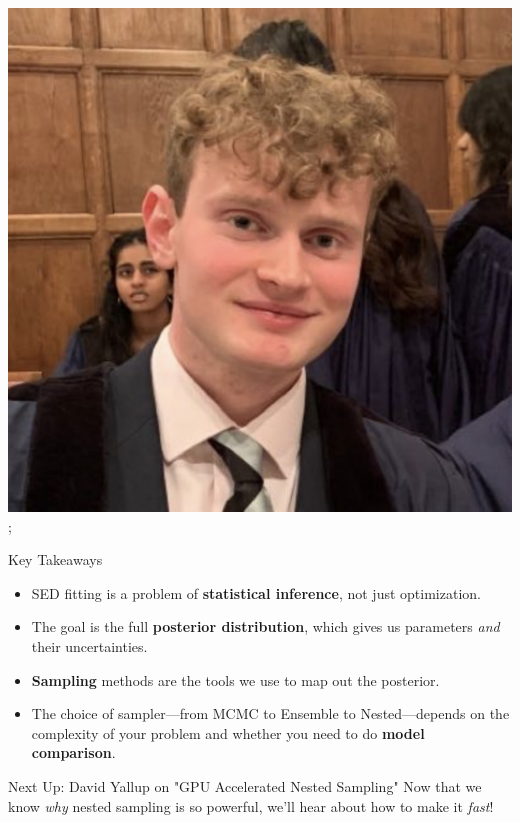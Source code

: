\documentclass[aspectratio=169]{beamer}
\newcommand{\keyterm}[1]{\textbf{\textcolor{C0}{#1}}}
\begin{document}
\begin{frame}
{        \includegraphics[width=0.06\textheight]{people/will_templeton.jpg}%
    };
    
    \begin{block}{Key Takeaways}
        \begin{itemize}
            \item SED fitting is a problem of \keyterm{statistical inference}, not just optimization.
            \item The goal is the full \keyterm{posterior distribution}, which gives us parameters \textit{and} their uncertainties.
            \item \keyterm{Sampling} methods are the tools we use to map out the posterior.
            \item The choice of sampler—from MCMC to Ensemble to Nested—depends on the complexity of your problem and whether you need to do \keyterm{model comparison}.
        \end{itemize}
    \end{block}
    
    \begin{alertblock}{Next Up: David Yallup on "GPU Accelerated Nested Sampling"}
        Now that we know \textit{why} nested sampling is so powerful, we'll hear about how to make it \textit{fast}!
    \end{alertblock}
\end{frame}
\end{document}
